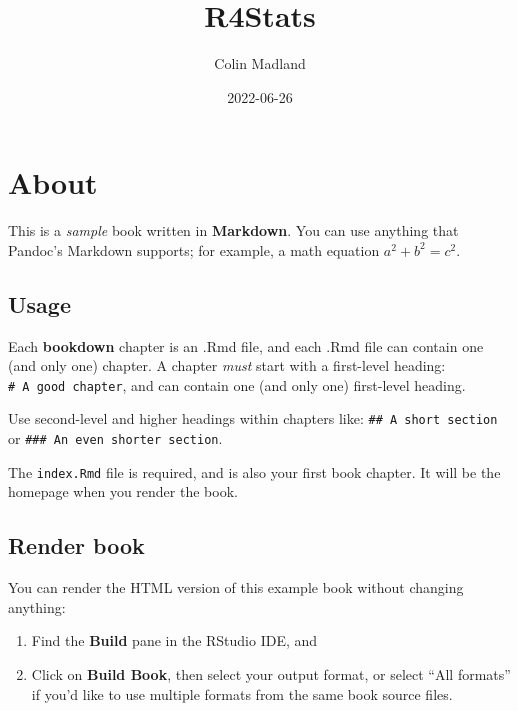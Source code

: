 \documentclass[
]{book}
\title{R4Stats}
\author{Colin Madland}
\date{2022-06-26}
\theoremstyle{definition}
\theoremstyle{definition}
\theoremstyle{definition}
\theoremstyle{definition}
\theoremstyle{remark}
\begin{document}
\maketitle

{
\setcounter{tocdepth}{1}
\tableofcontents
}
\hypertarget{about}{%
\chapter*{About}\label{about}}

This is a \emph{sample} book written in \textbf{Markdown}. You can use anything that Pandoc's Markdown supports; for example, a math equation \(a^2 + b^2 = c^2\).

\hypertarget{usage}{%
\section*{Usage}\label{usage}}

Each \textbf{bookdown} chapter is an .Rmd file, and each .Rmd file can contain one (and only one) chapter. A chapter \emph{must} start with a first-level heading: \texttt{\#\ A\ good\ chapter}, and can contain one (and only one) first-level heading.

Use second-level and higher headings within chapters like: \texttt{\#\#\ A\ short\ section} or \texttt{\#\#\#\ An\ even\ shorter\ section}.

The \texttt{index.Rmd} file is required, and is also your first book chapter. It will be the homepage when you render the book.

\hypertarget{render-book}{%
\section*{Render book}\label{render-book}}

You can render the HTML version of this example book without changing anything:

\begin{enumerate}
\def\labelenumi{\arabic{enumi}.}
\item
  Find the \textbf{Build} pane in the RStudio IDE, and
\item
  Click on \textbf{Build Book}, then select your output format, or select ``All formats'' if you'd like to use multiple formats from the same book source files.
\end{enumerate}
\end{document}
